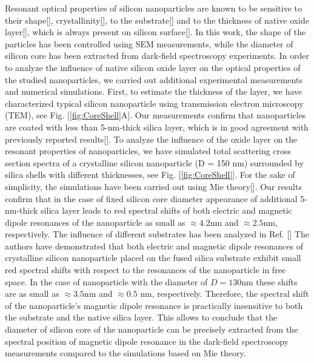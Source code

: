        Resonant optical properties of silicon nanoparticles are known to be sensitive to their shape[\cite{zywietz2015electromagnetic}],
        crystallinity[\cite{zywietz2015electromagnetic, dmitriev2016laser}], to the substrate[\cite{miroshnichenko2015substrate}] and
        to the thickness of native oxide layer[\cite{zywietz2015electromagnetic, fu2012directional}],
        which is always present on silicon surface[\cite{morita1990growth}]. In this work, the shape of the particles has been controlled using
        SEM measurements, while the diameter of silicon core has been extracted from dark-field spectroscopy experiments.
        In order to analyze the influence of native silicon oxide layer on the optical properties of the studied nanoparticles,
        we carried out additional experimental measurements and numerical simulations. First, to estimate the thickness of the
        layer, we have characterized typical silicon nanoparticle using transmission electron microscopy (TEM), see Fig. [\ref{fig:CoreShell}A].
        Our measurements confirm that nanoparticles are coated with less than 5-nm-thick silica layer, which is in good agreement
        with previously reported results[\cite{zywietz2015electromagnetic, fu2012directional}]. To analyze the influence of the oxide
        layer on the resonant properties of nanoparticles,
        we have simulated total scattering cross section spectra of a crystalline silicon nanoparticle (D = 150 nm) surrounded by
        silica shells with different thicknesses, see Fig. [\ref{fig:CoreShell}]. For the sake of simplicity, the simulations have been carried out
        using Mie theory[\cite{bohren1983absorption}]. Our results confirm that in the case of fixed silicon core diameter appearance of additional
        5-nm-thick silica layer leads to red spectral shifts of both electric and magnetic dipole resonances of the
        nanoparticle as small as $≈ 4.2$nm and $≈ 2.5$nm, respectively. The influence of different substrates has been analyzed in
        Ref. [\cite{miroshnichenko2015substrate}] The authors have demonstrated that both electric and magnetic dipole resonances of
        crystalline silicon nanoparticle
        placed on the fused silica substrate exhibit small red spectral shifts with respect to the resonances of the nanoparticle
        in free space. In the case of nanoparticle with the diameter of $D = 130 $nm these shifts are as small as $≈ 3.5 $nm and $≈ 0.5$ nm,
        respectively. Therefore, the spectral shift of the nanoparticle’s magnetic dipole resonance is practically insensitive to both
        the substrate and the native silica layer. This allows to conclude that the diameter of silicon core of the nanoparticle
        can be precisely extracted from the spectral position of magnetic dipole resonance in the dark-field spectroscopy measurements
        compared to the simulations based on Mie theory.


